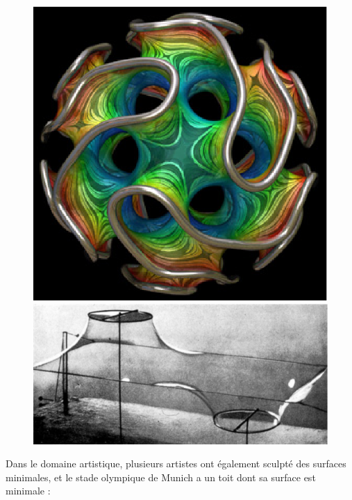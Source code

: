 \documentclass {report}
\begin{document}
\begin{figure}[h!]
   \begin{minipage}[b]{0.40\linewidth}
      \centering\includegraphics[scale=0.4]{Images_Fichiers/savongyroid.eps}
   \end{minipage}
   \begin{minipage}[b]{0.3\linewidth}   
     \centering\includegraphics[scale=0.3]{Images_Fichiers/savonriemann.eps}
   \end{minipage}
\end{figure}
\newpage

Dans le domaine artistique, plusieurs artistes ont également sculpté des surfaces minimales, et le stade olympique de Munich a un toit dont sa surface est minimale : 
\end{document}
